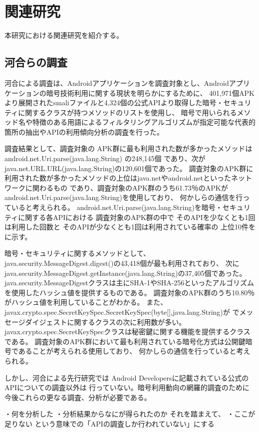 \newpage
\section{関連研究} %
本研究における関連研究を紹介する。
\subsection{河合らの調査}
河合による調査は、Androidアプリケーションを調査対象とし、Androidアプリケーションの暗号技術利用に関する現状を明らかにするために、
401,971個APKより展開されたsmaliファイルと4,324個の公式APIより取得した暗号・セキュリティに関するクラスが持つメソッドのリストを使用し、
暗号で用いられるメソッド名や特徴のある用語によるフィルタリングアルゴリズムが指定可能な代表的箇所の抽出やAPIの利用傾向分析の調査を行った。

調査結果として、調査対象の APK群に最も利用された数が多かったメソッドは
android.net.Uri.parse(java.lang.String) の248,145個
であり、次がjava.net.URL.URL(java.lang.String)の120,601個であった。
調査対象のAPK群に利用された数が多かったメソッドの上位はjava.netやandroid.netといったネットワークに関わるもの
であり、調査対象のAPK群のうち61.73％のAPKがandroid.net.Uri.parse(java.lang.String)を使用しており、
何かしらの通信を行っていると考えられる。
\if
android.net.Uri.parse(java.lang.String)を暗号・セキュリティに関する各APIにおける
調査対象のAPK群の中で
そのAPIを少なくとも1回は利用した回数と
そのAPIが少なくとも1回は利用されている確率の
上位10件を%
に示す。
\fi

暗号・セキュリティに関するメソッドとして、
java.security.MessageDigest.digest()の43,418個が最も利用されており、
次にjava.security.MessageDigest.getInstance(java.lang.String)の37,405個であった。
java.security.MessageDigestクラスは主にSHA-1やSHA-256といったアルゴリズムを使用したハッシュ値を提供するものである。
調査対象のAPK群のうち10.80％がハッシュ値を利用していることがわかる。
また、
javax.crypto.spec.SecretKeySpec.SecretKeySpec(byte[],java.lang.String)が%
でメッセージダイジェストに関するクラスの次に利用数が多い。
javax.crypto.spec.SecretKeySpecクラスは秘密鍵に関する機能を提供するクラスである。
調査対象のAPK群において最も利用されている暗号化方式は公開鍵暗号であることが考えられる使用しており、
何かしらの通信を行っていると考えられる。







しかし、河合による先行研究では Android Developersに記載されている公式のAPIについての調査以外は
行っていない。暗号利用動向の網羅的調査のために今後これらの更なる調査、分析が必要である。

・何を分析した
・分析結果からなにが得られたのか
それを踏まえて、
・ここが足りない
という意味での「APIの調査しか行われていない」にする
\fi